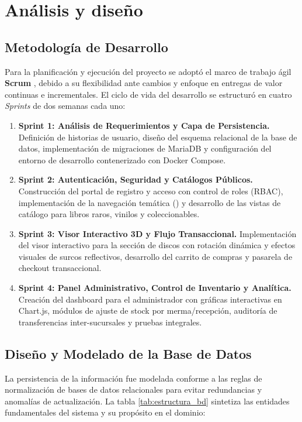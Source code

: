 \chapter{Análisis y diseño}

\section{Metodología de Desarrollo}
Para la planificación y ejecución del proyecto se adoptó el marco de trabajo ágil \textbf{Scrum} \cite{pressman2021}, debido a su flexibilidad ante cambios y enfoque en entregas de valor continuas e incrementales. El ciclo de vida del desarrollo se estructuró en cuatro \textit{Sprints} de dos semanas cada uno:

\begin{enumerate}
    \item \textbf{Sprint 1: Análisis de Requerimientos y Capa de Persistencia.} Definición de historias de usuario, diseño del esquema relacional de la base de datos, implementación de migraciones de MariaDB y configuración del entorno de desarrollo contenerizado con Docker Compose.
    \item \textbf{Sprint 2: Autenticación, Seguridad y Catálogos Públicos.} Construcción del portal de registro y acceso con control de roles (RBAC), implementación de la navegación temática () y desarrollo de las vistas de catálogo para libros raros, vinilos y coleccionables.
    \item \textbf{Sprint 3: Visor Interactivo 3D y Flujo Transaccional.} Implementación del visor interactivo para la sección de discos con rotación dinámica y efectos visuales de surcos reflectivos, desarrollo del carrito de compras y pasarela de checkout transaccional.
    \item \textbf{Sprint 4: Panel Administrativo, Control de Inventario y Analítica.} Creación del dashboard para el administrador con gráficas interactivas en Chart.js, módulos de ajuste de stock por merma/recepción, auditoría de transferencias inter-sucursales y pruebas integrales.
\end{enumerate}

\section{Diseño y Modelado de la Base de Datos}
La persistencia de la información fue modelada conforme a las reglas de normalización de bases de datos relacionales para evitar redundancias y anomalías de actualización. La tabla \ref{tab:estructura_bd} sintetiza las entidades fundamentales del sistema y su propósito en el dominio:

